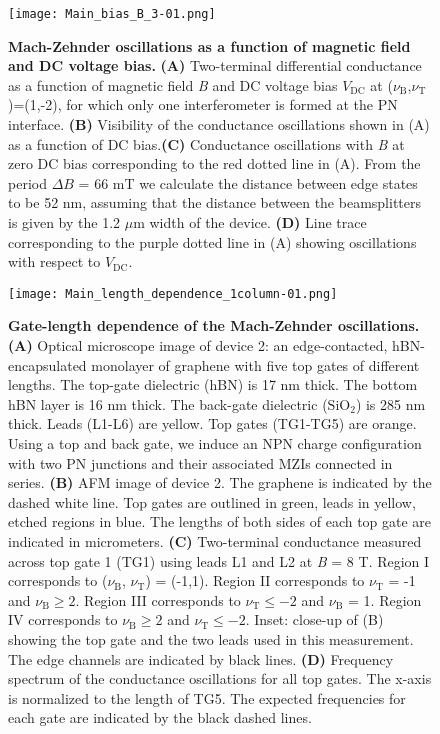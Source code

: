 \documentclass[%
reprint,amsmath,amssymb,aps,prl,superscriptaddress,
twocolumn
]{revtex4-1}
\begin{document}
			\twocolumngrid
						
			\begin{figure}
				\texttt{[image: Main\_bias\_B\_3-01.png]}%
				\caption{\textbf{Mach-Zehnder oscillations as a function of magnetic field and DC voltage bias.} \textbf{(A)} Two-terminal differential conductance as a function of magnetic field \emph{B} and DC voltage bias $V_\mathrm{DC}$ at ($\nu_\mathrm{B}$,$\nu_\mathrm{T}$)=(1,-2), for which only one interferometer is formed at the PN interface. \textbf{(B)} Visibility of the conductance oscillations shown in (A) as a function of DC bias.\textbf{(C)} Conductance oscillations with \emph{B} at zero DC bias corresponding to the red dotted line in (A). From the period $\Delta B$ = 66 mT we calculate the distance between edge states to be 52 nm, assuming that the distance between the beamsplitters is given by the 1.2 $\mu$m width of the device. \textbf{(D)} Line trace corresponding to the purple dotted line in (A) showing oscillations with respect to $V_\mathrm{DC}$.}
							\label{fig:F3}
			\end{figure} 
			\twocolumngrid
						

	\twocolumngrid
	
		\begin{figure}[b] 
			\texttt{[image: Main\_length\_dependence\_1column-01.png]}%
			\caption{\textbf{Gate-length dependence of the Mach-Zehnder oscillations.} \textbf{(A)} Optical microscope image of device 2: an edge-contacted, hBN-encapsulated monolayer of graphene with five top gates of different lengths. The top-gate dielectric (hBN) is 17 nm thick. The bottom hBN layer is 16 nm thick. The back-gate dielectric ($\mathrm{SiO}_2$) is 285 nm thick. Leads (L1-L6) are yellow. Top gates (TG1-TG5) are orange. Using  a top and back gate, we induce an NPN charge configuration with two PN junctions and their associated MZIs connected in series. \textbf{(B)} AFM image of device 2. The graphene is indicated by the dashed white line. Top gates are outlined in green, leads in yellow, etched regions in blue. The lengths of both sides of each top gate are indicated in micrometers. \textbf{(C)} Two-terminal conductance measured across top gate 1 (TG1) using leads L1 and L2 at \emph{B} = 8 T. Region I corresponds to ($\nu_\mathrm{B}$, $\nu_\mathrm{T}$) = (-1,1).  Region II corresponds to $\nu_\mathrm{T}$ = -1 and $\nu_\mathrm{B} \geq 2$. Region III corresponds to $\nu_\mathrm{T} \leq -2$ and $\nu_\mathrm{B}$ = 1. Region IV corresponds to $\nu_\mathrm{B} \geq 2$ and $\nu_\mathrm{T} \leq -2$. Inset: close-up of (B) showing the top gate and the two leads used in this measurement. The edge channels are indicated by black lines. \textbf{(D)} Frequency spectrum of the conductance oscillations for all top gates.  The x-axis is normalized to the length of TG5. The expected frequencies for each gate are indicated by the black dashed lines.}
			\label{fig:F4}
		\end{figure}
\twocolumngrid
\end{document}
